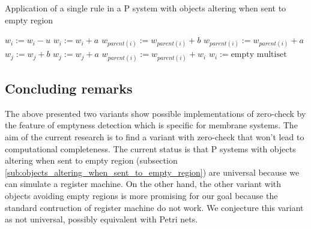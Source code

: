 \begin{algorithm}
  \caption{Application of a single rule in a P system with objects altering when sent to empty region}\label{alg:application_of_a_rule_in_a_p_system_with_objects_altering_when_sent_to_empty_region}
  \begin{algorithmic}[1]
      \State $w_i := w_i - u$
        \State $w_i := w_i + a$
      \EndFor
          \State $w_{parent(i)} := w_{parent(i)} + b$
        \Else
          \State $w_{parent(i)} := w_{parent(i)} + a$
        \EndIf
      \EndFor
          \State $w_j := w_j + b$
        \Else
          \State $w_j := w_j + a$
        \EndIf
      \EndFor
        \State $w_{parent(i)} := w_{parent(i)} + w_i$
        \State $w_i := \text{empty multiset}$
      \EndIf
    \EndProcedure
  \end{algorithmic}
\end{algorithm}


\subsection{Concluding remarks} %
\label{sub:concluding_remarks_of_emptyness_detection}

The above presented two variants show possible implementations of zero-check by the feature of emptyness detection which is specific for membrane systems. The aim of the current research is to find a variant with zero-check that won't lead to computational completeness. The current status is that P systems with objects altering when sent to empty region (subsection \ref{sub:objects_altering_when_sent_to_empty_region}) are universal because we can simulate a register machine. On the other hand, the other variant with objects avoiding empty regions is more promising for our goal because the standard contruction of register machine do not work. We conjecture this variant as not universal, possibly equivalent with Petri nets.

